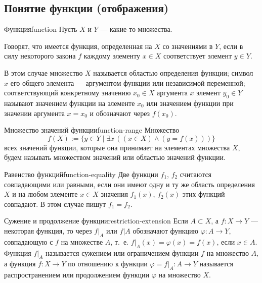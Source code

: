 
\subsection{Понятие функции (отображения)}

\begin{definition}{Функция}{function}
  Пусть $X$ и $Y$ — какие-то множества.

  Говорят, что имеется функция, определенная на $X$ со значениями в $Y$, если
  в силу некоторого закона $f$ каждому элементу $x\in X$ соответствует элемент
  $y\in Y$.

  В этом случае множество $X$ называется областью определения функции;
  символ $x$ его общего элемента — аргументом функции или независимой
  переменной; соответствующий конкретному значению $x_0\in X$ аргумента $x$
  элемент $y_0\in Y$ называют значением функции на элементе $x_0$ или
  значением функции при значении аргумента $x=x_0$ и обозначают через
  $f(x_0)$.
\end{definition}

\begin{definition}{Множество значений функции}{function-range}
  Множество
  \[
    f(X):=\{y\in Y\mid\exists x\,((x\in X)\land(y=f(x)))\}
  \]
  всех значений функции, которые она принимает на элементах множества $X$,
  будем называть множеством значений или областью значений функции.
\end{definition}

\begin{definition}{Равенство функций}{function-equality}
  Две функции $f_1$, $f_2$ считаются совпадающими или равными, если они имеют
  одну и ту же область определения $X$ и на любом элементе $x\in X$ значения
  $f_1(x)$, $f_2(x)$ этих функций совпадают. В этом случае пишут $f_1=f_2$.
\end{definition}

\begin{definition}{Сужение и продолжение функции}{restriction-extension}
  Если $A\subset X$, а $f:X\to Y$ — некоторая функция, то через $f|_A$ или
  $f|A$ обозначают функцию $\varphi:A\to Y$, совпадающую с $f$ на множестве
  $A$, т.~е. $f|_A(x)=\varphi(x)=f(x)$, если $x\in A$. Функция $f|_A$
  называется сужением или ограничением функции $f$ на множество $A$, а
  функция $f:X\to Y$ по отношению к функции $\varphi=f|_A:A\to Y$
  называется распространением или продолжением функции $\varphi$ на
  множество $X$.
\end{definition}

